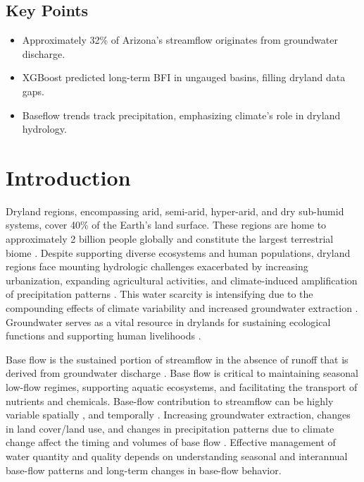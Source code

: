 \documentclass[
  authoryear,
  preprint,
  1p,
  onecolumn]{elsarticle}
\providecommand{\tightlist}{%
  \setlength{\itemsep}{0pt}\setlength{\parskip}{0pt}}\usepackage{longtable,booktabs,array}
\begin{document}
\subsection{Key Points}\label{key-points}

\begin{itemize}
\tightlist
\item
  Approximately 32\% of Arizona's streamflow originates from groundwater
  discharge.
\item
  XGBoost predicted long-term BFI in ungauged basins, filling dryland
  data gaps.
\item
  Baseflow trends track precipitation, emphasizing climate's role in
  dryland hydrology.
\end{itemize}

\section{Introduction}\label{sec-intro}

Dryland regions, encompassing arid, semi-arid, hyper-arid, and dry
sub-humid systems, cover 40\% of the Earth's land surface. These regions
are home to approximately 2 billion people globally and constitute the
largest terrestrial biome \citep{iucn-drylands-2019}. Despite supporting
diverse ecosystems and human populations, dryland regions face mounting
hydrologic challenges exacerbated by increasing urbanization, expanding
agricultural activities, and climate-induced amplification of
precipitation patterns \citep{taylor2013}. This water scarcity is
intensifying due to the compounding effects of climate variability and
increased groundwater extraction \citep{taylor2013}. Groundwater serves
as a vital resource in drylands for sustaining ecological functions and
supporting human livelihoods \citep{scanlon2006, yao2018}.

Base flow is the sustained portion of streamflow in the absence of
runoff that is derived from groundwater discharge
\citep{usgs-glossary-2018}. Base flow is critical to maintaining
seasonal low-flow regimes, supporting aquatic ecosystems, and
facilitating the transport of nutrients and chemicals. Base-flow
contribution to streamflow can be highly variable spatially
\citep{singh2018, bosch2017, beck2013}, and temporally
\citep{ficklin2016, tan2020}. Increasing groundwater extraction, changes
in land cover/land use, and changes in precipitation patterns due to
climate change affect the timing and volumes of base flow
\citep{tan2020, taylor2013}. Effective management of water quantity and
quality depends on understanding seasonal and interannual base-flow
patterns and long-term changes in base-flow behavior.
\end{document}
